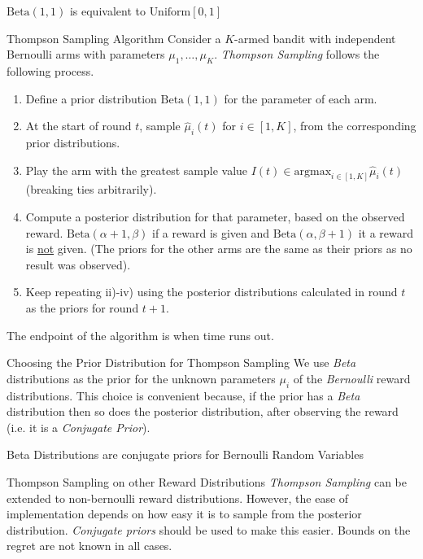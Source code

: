 \documentclass[11pt,a4paper]{article}
\begin{document}
\begin{remark}{$\text{Beta}(1,1)$ is equivalent to $\text{Uniform}[0,1]$}

\end{remark}

\begin{proposition}{Thompson Sampling Algorithm}
  Consider a $K$-armed bandit with independent Bernoulli arms with parameters $\mu_1,\dots,\mu_K$. \textit{Thompson Sampling} follows the following process.
  \begin{enumerate}
    \item Define a prior distribution $\text{Beta}(1,1)$ for the parameter of each arm.
    \item At the start of round $t$, sample $\hat\mu_i(t)$ for $i\in[1,K]$, from the corresponding prior distributions.
    \item Play the arm with the greatest sample value $I(t)\in\text{argmax}_{i\in[1,K]}\hat\mu_i(t)$ (breaking ties arbitrarily).
    \item Compute a posterior distribution for that parameter, based on the observed reward. $\text{Beta}(\alpha+1,\beta)$ if a reward is given and $\text{Beta}(\alpha,\beta+1)$ it a reward is \underline{not} given. (The priors for the other arms are the same as their priors as no result was observed).
    \item Keep repeating ii)-iv) using the posterior distributions calculated in round $t$ as the priors for round $t+1$.
  \end{enumerate}
  The endpoint of the algorithm is when time runs out.
\end{proposition}

\begin{proposition}{Choosing the Prior Distribution for Thompson Sampling}
  We use \textit{Beta} distributions as the prior for the unknown parameters $\mu_i$ of the \textit{Bernoulli} reward distributions. This choice is convenient because, if the prior has a \textit{Beta} distribution then so does the posterior distribution, after observing the reward (i.e. it is a \textit{Conjugate Prior}).
\end{proposition}

\begin{remark}{Beta Distributions are conjugate priors for Bernoulli Random Variables}
\end{remark}

\begin{remark}{Thompson Sampling on other Reward Distributions}
  \textit{Thompson Sampling} can be extended to non-bernoulli reward distributions. However, the ease of implementation depends on how easy it is to sample from the posterior distribution. \textit{Conjugate priors} should be used to make this easier. Bounds on the regret are not known in all cases.
\end{remark}
\end{document}
